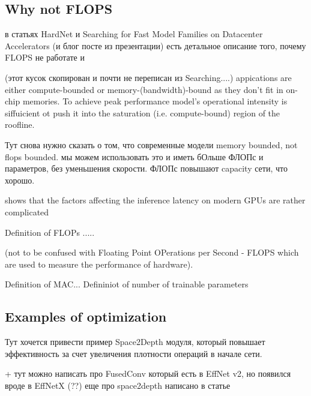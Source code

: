\subsection{Why not FLOPS}
в статьях HardNet и Searching for Fast Model Families on Datacenter Accelerators (и блог посте из презентации) есть детальное описание того, почему FLOPS не работате и 

(этот кусок скопирован и почти не переписан из Searching....) 
appications are either compute-bounded or memory-(bandwidth)-bound as they don't fit in on-chip memories. To achieve peak performance model's operational intensity is siffuicient ot push it into the saturation (i.e. compute-bound) region of the roofline.  

Тут снова нужно сказать о том, что современные модели memory bounded, not flops bounded. мы можем использовать это и иметь бОльше ФЛОПс и параметров, без уменьшения скорости. ФЛОПс повышают capacity сети, что хорошо. 


shows that the factors affecting the inference latency on modern GPUs are rather complicated



Definition of FLOPs .....

(not to be confused with Floating Point OPerations per Second - FLOPS which are used to measure the performance of hardware). 


Definition of MAC...
Defininiot of number of trainable parameters


\subsection{Examples of optimization}
Тут хочется привести пример Space2Depth модуля, который повышает эффективность за счет увеличения плотности операций в начале сети. 

 + тут можно написать про FusedConv который есть в EffNet v2, но появился вроде в EffNetX (??) 
еще про space2depth написано в статье \cite{ridnik2021_tresnet}


